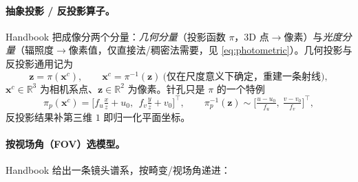 \paragraph{抽象投影 / 反投影算子。}
Handbook\cite{carlone2026handbook} 把成像分两个分量：\emph{几何分量}（投影函数 $\pi$，3D 点$\to$像素）与\emph{光度分量}（辐照度$\to$像素值，仅直接法/稠密法需要，见 \cref{eq:photometric}）。几何投影与反投影通用记为
\begin{equation}
  \mathbf{z}=\pi(\mathbf{x}^c),\qquad
  \mathbf{x}^c=\pi^{-1}(\mathbf{z})\ \text{(仅在尺度意义下确定，重建一条射线)},
  \label{eq:abstract-pi}
\end{equation}
$\mathbf{x}^c\in\mathbb{R}^3$ 为相机系点、$\mathbf{z}\in\mathbb{R}^2$ 为像素。针孔只是 $\pi$ 的一个特例
\begin{equation}
  \pi_p(\mathbf{x}^c)=\Big[f_u\tfrac{x}{z}+u_0,\ \ f_v\tfrac{y}{z}+v_0\Big]^\top,\qquad
  \pi_p^{-1}(\mathbf{z})\sim\Big[\tfrac{u-u_0}{f_u},\ \tfrac{v-v_0}{f_v}\Big]^\top,
  \label{eq:pi-pinhole}
\end{equation}
反投影结果补第三维 $1$ 即归一化平面坐标。

\paragraph{按视场角（FOV）选模型。}
Handbook\cite{carlone2026handbook} 给出一条镜头谱系，按畸变/视场角递进：

